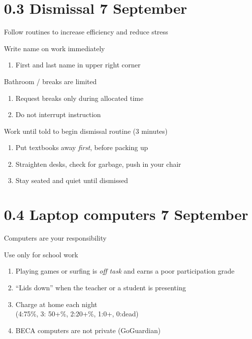 \documentclass[onlytextwidth]{beamer}
\begin{document}
\section{0.3 Dismissal \hfill 7 September}
\begin{frame}{Follow routines to increase efficiency and reduce stress}
  \begin{block}{Write name on work immediately}
    \begin{enumerate}
      \item First and last name in upper right corner
    \end{enumerate}
    \end{block}
  \begin{block}{Bathroom / breaks are limited}
    \begin{enumerate}
      \item Request breaks only during allocated time
      \item Do not interrupt instruction
    \end{enumerate}
    \end{block}
  \begin{block}{Work until told to begin dismissal routine (3 minutes)}
    \begin{enumerate}
      \item Put textbooks away \emph{first}, before packing up
      \item Straighten desks, check for garbage, push in your chair
      \item Stay seated and quiet until dismissed
    \end{enumerate}
    \end{block}
  \end{frame}

\section{0.4 Laptop computers \hfill 7 September}
\begin{frame}{Computers are your responsibility}
  \begin{block}{Use only for school work}
    \begin{enumerate}
      \item Playing games or surfing is \emph{off task} and earns a poor participation grade
      \item ``Lids down'' when the teacher or a student is presenting
      \item Charge at home each night\\
        (4:75\%, 3: 50+\%, 2:20+\%, 1:0+, 0:dead)
      \item BECA computers are not private (GoGuardian)
    \end{enumerate}
    \end{block}
  \end{frame}
\end{document}
